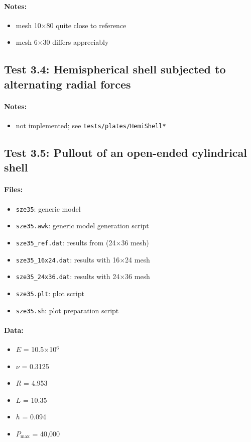 \documentclass{article}
\newcommand{\mesh}[2]{#1$\times$#2}
\begin{document}
\paragraph{Notes:}
\begin{itemize}
\item mesh \mesh{10}{80} quite close to reference
\item mesh \mesh{6}{30} differs appreciably
\end{itemize}


\subsection{Test 3.4: Hemispherical shell subjected to alternating radial forces}

\paragraph{Notes:}
\begin{itemize}
\item not implemented; see \verb!tests/plates/HemiShell*!
\end{itemize}


\subsection{Test 3.5: Pullout of an open-ended cylindrical shell}

\paragraph{Files:}
\begin{itemize}
\item \verb!sze35!: generic model
\item \verb!sze35.awk!: generic model generation script
\item \verb!sze35_ref.dat!: results from \cite{SZE-2004} (\mesh{24}{36} mesh)
\item \verb!sze35_16x24.dat!: results with \mesh{16}{24} mesh
\item \verb!sze35_24x36.dat!: results with \mesh{24}{36} mesh
\item \verb!sze35.plt!: plot script
\item \verb!sze35.sh!: plot preparation script
\end{itemize}

\paragraph{Data:}
\begin{itemize}
\item $E$ = 10.5$\times$10$^6$
\item $\nu$ = 0.3125
\item $R$ = 4.953
\item $L$ = 10.35
\item $h$ = 0.094
\item $P_\text{max}$ = 40,000
\end{itemize}
\end{document}
